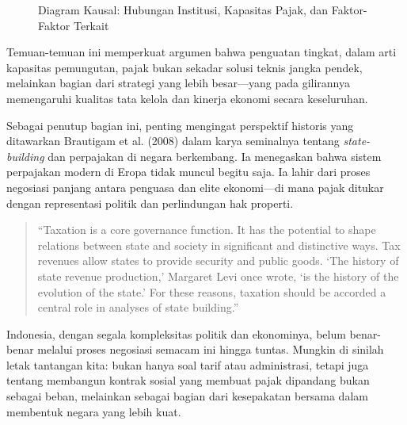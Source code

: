 \begin{figure}[hbt!]
\caption{Diagram Kausal: Hubungan Institusi, Kapasitas Pajak, dan Faktor-Faktor Terkait}
\label{fig:integrated_causal}
\end{figure}

Temuan-temuan ini memperkuat argumen bahwa penguatan tingkat, dalam arti kapasitas pemungutan, pajak bukan sekadar solusi teknis jangka pendek, melainkan bagian dari strategi yang lebih besar—yang pada gilirannya memengaruhi kualitas tata kelola dan kinerja ekonomi secara keseluruhan.

Sebagai penutup bagian ini, penting mengingat perspektif historis yang ditawarkan Brautigam et al. (2008) dalam karya seminalnya tentang \textit{state-building} dan perpajakan di negara berkembang. Ia menegaskan bahwa sistem perpajakan modern di Eropa tidak muncul begitu saja. Ia lahir dari proses negosiasi panjang antara penguasa dan elite ekonomi—di mana pajak ditukar dengan representasi politik dan perlindungan hak properti. 

\begin{quote}
“Taxation is a core governance function. It has the potential to shape relations between state and society in significant and distinctive ways. Tax revenues allow states to provide security and public goods. ‘The history of state revenue production,’ Margaret Levi once wrote, ‘is the history of the evolution of the state.’ For these reasons, taxation should be accorded a central role in analyses of state building.” \citep{brautigam_2008_taxation}
\end{quote}

Indonesia, dengan segala kompleksitas politik dan ekonominya, belum benar-benar melalui proses negosiasi semacam ini hingga tuntas. Mungkin di sinilah letak tantangan kita: bukan hanya soal tarif atau administrasi, tetapi juga tentang membangun kontrak sosial yang membuat pajak dipandang bukan sebagai beban, melainkan sebagai bagian dari kesepakatan bersama dalam membentuk negara yang lebih kuat.

